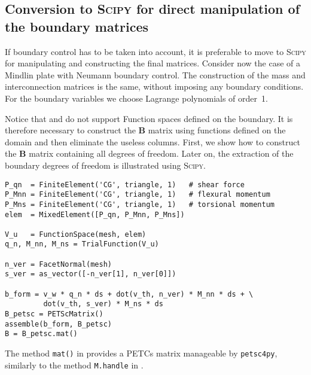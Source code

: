 \subsection*{Conversion to \textsc{Scipy} for direct manipulation of the boundary matrices}
If boundary control has to be taken into account, it is preferable to move to \textsc{Scipy} for manipulating and constructing the final matrices. Consider now the case of a Mindlin plate with Neumann boundary control. The construction of the mass and interconnection matrices is the same, without imposing any boundary conditions. For the boundary variables we choose Lagrange polynomials of order~1. 

\begin{remark}\label{rmk:Bmatrix}
Notice that \fenics and \firedrake do not support Function spaces defined on the boundary. It is therefore necessary to construct the $\mathbf{B}$ matrix using functions defined on the domain and then eliminate the useless columns. First, we show how to construct the $\mathbf{B}$ matrix containing all degrees of freedom. Later on, the extraction of the boundary degrees of freedom is illustrated using \textsc{Scipy}. 
\end{remark}

\begin{tcolorbox}[title = Control matrix construction in  \fenics, coltitle=black, breakable, size=fbox, boxrule=1pt, pad at break*=1mm, colframe=red, enlarge top by=0.25em, enlarge bottom by=0.5em]
\begin{Verbatim}[tabsize=4]
P_qn  = FiniteElement('CG', triangle, 1)   # shear force
P_Mnn = FiniteElement('CG', triangle, 1)   # flexural momentum
P_Mns = FiniteElement('CG', triangle, 1)   # torsional momentum
elem  = MixedElement([P_qn, P_Mnn, P_Mns])
 
V_u   = FunctionSpace(mesh, elem)
q_n, M_nn, M_ns = TrialFunction(V_u)

n_ver = FacetNormal(mesh)  
s_ver = as_vector([-n_ver[1], n_ver[0]])

b_form = v_w * q_n * ds + dot(v_th, n_ver) * M_nn * ds + \
		 dot(v_th, s_ver) * M_ns * ds	 
B_petsc = PETScMatrix()
assemble(b_form, B_petsc)
B = B_petsc.mat()
\end{Verbatim}
\end{tcolorbox}	
The method \verb|mat()| in \fenics provides a PETCs matrix manageable by \verb|petsc4py|, similarly to the method \verb|M.handle| in \firedrake.

